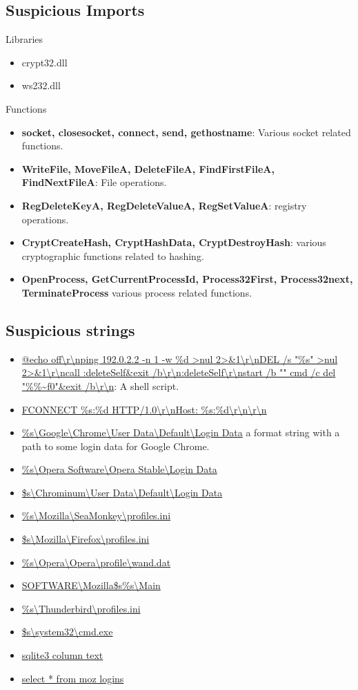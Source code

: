 \documentclass{article}
\begin{document}
    \subsection{Suspicious Imports}
    Libraries
    \begin{itemize}
        \item crypt32.dll
        \item ws2\textunderscore32.dll
    \end{itemize}
    Functions
    \begin{itemize}
        \item \textbf{socket, closesocket, connect, send, gethostname}: Various socket related functions.
        \item \textbf{WriteFile, MoveFileA, DeleteFileA, FindFirstFileA, FindNextFileA}: File operations.
        \item \textbf{RegDeleteKeyA, RegDeleteValueA, RegSetValueA}: registry operations.
        \item \textbf{CryptCreateHash, CryptHashData, CryptDestroyHash}: various cryptographic functions related to hashing.
        \item \textbf{OpenProcess, GetCurrentProcessId, Process32First, Process32next, TerminateProcess} various process related functions.
    \end{itemize}
    \subsection{Suspicious strings}
    \begin{itemize}
        \item \url{@echo off\r\nping 192.0.2.2 -n 1 -w %d >nul 2>&1\r\nDEL /s "%s" >nul 2>&1\r\ncall :deleteSelf&exit /b\r\n:deleteSelf\r\nstart /b "" cmd /c del "%%~f0"&exit /b\r\n}: A shell script.
        \item \url{FCONNECT %s:%d HTTP/1.0\r\nHost: %s:%d\r\n\r\n}
        \item \url{%s\Google\Chrome\User Data\Default\Login Data} a format string with a path to some login data for Google Chrome.
        \item \url{%s\Opera Software\Opera Stable\Login Data}
        \item \url{$s\Chrominum\User Data\Default\Login Data}
        \item \url{%s\Mozilla\SeaMonkey\profiles.ini}
        \item \url{$s\Mozilla\Firefox\profiles.ini}
        \item \url{%s\Opera\Opera\profile\wand.dat}
        \item \url{SOFTWARE\Mozilla\$s\%s\Main}
        \item \url{%s\Thunderbird\profiles.ini}
        \item \url{$s\system32\cmd.exe}
        \item \url{sqlite3 column text}
        \item \url{select * from moz logins}
    \end{itemize}
\end{document}
